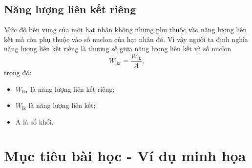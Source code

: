 \subsection{Năng lượng liên kết riêng}
Mức độ bền vững của một hạt nhân không những phụ thuộc vào năng lượng liên kết mà còn phụ thuộc vào số nuclon của hạt nhân đó. Vì vậy người ta định nghĩa năng lượng liên kết riêng là thương số giữa năng lượng liên kết và số nuclon
\begin{equation}
	W_\text{lkr}=\dfrac{W_\text{lk}}{A},
\end{equation}
trong đó:
\begin{itemize}
	\item $W_\text{lkr}$ là năng lượng liên kết riêng;
	\item $W_\text{lk}$ là năng lượng liên kết;
	\item A là số khối.
\end{itemize}

\section{Mục tiêu bài học - Ví dụ minh họa}

